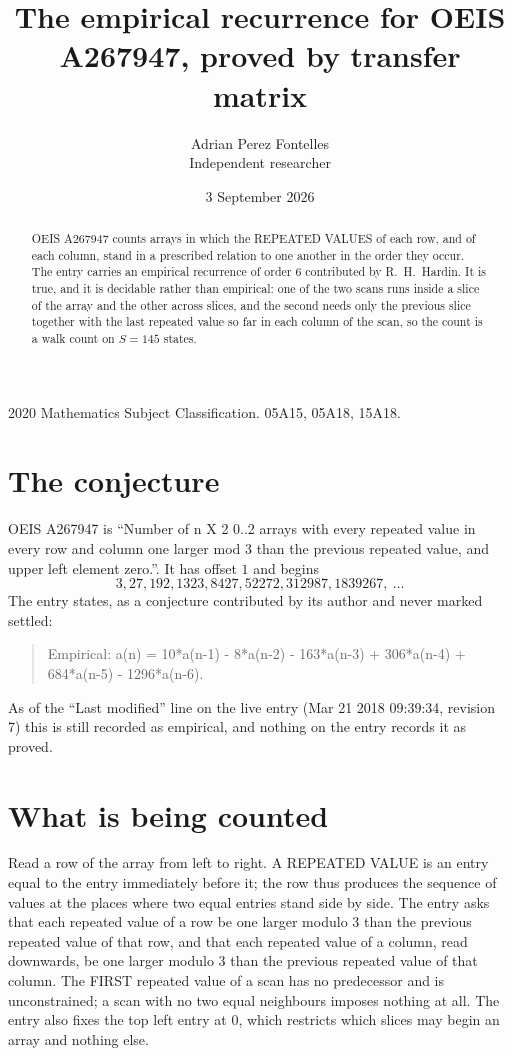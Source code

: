 \documentclass[11pt,a4paper]{article}
\title{The empirical recurrence for OEIS A267947, proved by transfer matrix}
\author{Adrian Perez Fontelles\\ \small Independent researcher}
\date{3 September 2026}
\theoremstyle{plain}
\theoremstyle{definition}
\begin{document}
\maketitle

\begin{abstract}
OEIS A267947 counts arrays in which the REPEATED VALUES of each row, and of each column, stand in a
prescribed relation to one another in the order they occur. The entry carries an empirical
recurrence of order $6$ contributed by R.~H.~Hardin. It is true, and it is decidable
rather than empirical: one of the two scans runs inside a slice of the array and the other
across slices, and the second needs only the previous slice together with the last repeated
value so far in each column of the scan, so the count is a walk count on $S=145$ states.
\end{abstract}

\noindent\small 2020 Mathematics Subject Classification. 05A15, 05A18, 15A18.\normalsize

\section{The conjecture}

OEIS A267947 is ``Number of n X 2 0..2 arrays with every repeated value in every row and column one larger mod 3 than the previous repeated value, and upper left element zero.''. It has offset $1$ and begins
\[
3, 27, 192, 1323, 8427, 52272, 312987, 1839267,\ \dots
\]
The entry states, as a conjecture contributed by its author and never marked settled:
\begin{quote}
Empirical: a(n) = 10*a(n-1) - 8*a(n-2) - 163*a(n-3) + 306*a(n-4) + 684*a(n-5) - 1296*a(n-6).
\end{quote}
As of the ``Last modified'' line on the live entry (Mar 21 2018 09:39:34, revision 7) this is still
recorded as empirical, and nothing on the entry records it as proved.

\section{What is being counted}

Read a row of the array from left to right. A REPEATED VALUE is an entry equal to the entry
immediately before it; the row thus produces the sequence of values at the places where two
equal entries stand side by side. The entry asks that each repeated value of a row be
one larger modulo 3 than the previous repeated value of that row, and that each repeated value of a column,
read downwards, be one larger modulo 3 than the previous repeated value of that column. The FIRST repeated
value of a scan has no predecessor and is unconstrained; a scan with no two equal neighbours
imposes nothing at all. The entry also fixes the top left entry at $0$, which restricts which slices may begin an array and nothing else.
\end{document}
